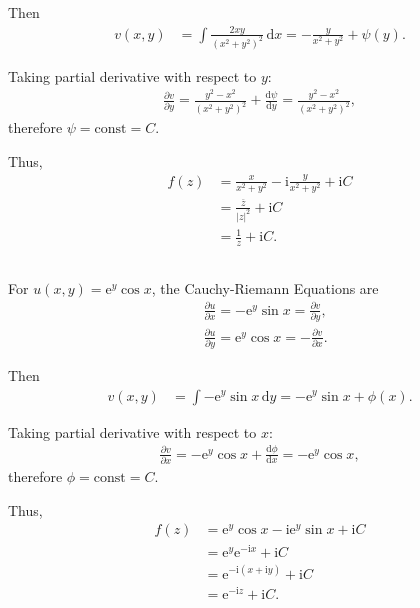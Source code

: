 \documentclass[12pt]{article}
\begin{document}
Then
\begin{align*}
v(x,y) &= \int \frac{2xy}{(x^2 + y^2)^2} \, \mathrm{d}x = -\frac{y}{x^2 + y^2} + \psi(y).
\end{align*}

Taking partial derivative with respect to \( y \):
\begin{align*}
\frac{\partial v}{\partial y} = \frac{y^2 - x^2}{(x^2 + y^2)^2} + \frac{\mathrm{d}\psi}{\mathrm{d}y} = \frac{y^2 - x^2}{(x^2 + y^2)^2},
\end{align*}
therefore \( \psi = \text{const} = C \).

Thus,
\begin{align*}
f(z) &= \frac{x}{x^2 + y^2} - \mathrm{i} \frac{y}{x^2 + y^2} + \mathrm{i}C \\
&= \frac{\overline{z}}{|z|^2} + \mathrm{i}C \\
&= \frac{1}{z} + \mathrm{i}C.
\end{align*}
\subsection{}
For \( u(x,y) = \mathrm{e}^y \cos x \), the Cauchy-Riemann Equations are
\begin{align*}
&\frac{\partial u}{\partial x} = -\mathrm{e}^y \sin x = \frac{\partial v}{\partial y}, \\
&\frac{\partial u}{\partial y} = \mathrm{e}^y \cos x = -\frac{\partial v}{\partial x}.
\end{align*}

Then
\begin{align*}
v(x,y) &= \int -\mathrm{e}^y \sin x \, \mathrm{d}y = -\mathrm{e}^y \sin x + \phi(x).
\end{align*}

Taking partial derivative with respect to \( x \):
\begin{align*}
\frac{\partial v}{\partial x} = -\mathrm{e}^y \cos x + \frac{\mathrm{d}\phi}{\mathrm{d}x} = -\mathrm{e}^y \cos x,
\end{align*}
therefore \( \phi = \text{const} = C \).

Thus,
\begin{align*}
f(z) &= \mathrm{e}^y \cos x - \mathrm{i} \mathrm{e}^y \sin x + \mathrm{i}C \\
&= \mathrm{e}^y \mathrm{e}^{-\mathrm{i}x} + \mathrm{i}C \\
&= \mathrm{e}^{-\mathrm{i}(x + \mathrm{i}y)} + \mathrm{i}C \\
&= \mathrm{e}^{-\mathrm{i}z} + \mathrm{i}C.
\end{align*}
\end{document}
